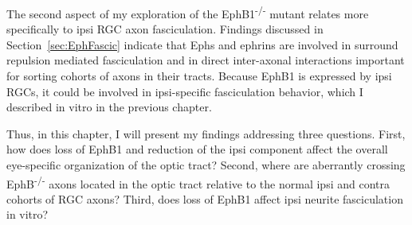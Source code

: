 The second aspect of my exploration of the EphB1\textsuperscript{-/-} mutant relates more specifically to ipsi RGC axon fasciculation.
Findings discussed in Section~\ref{sec:EphFascic} indicate that Ephs and ephrins are involved in surround repulsion mediated fasciculation and in direct inter-axonal interactions important for sorting cohorts of axons in their tracts.
Because EphB1 is expressed by ipsi RGCs, it could be involved in ipsi-specific fasciculation behavior, which I described in vitro in the previous chapter.

Thus, in this chapter, I will present my findings addressing three questions.
First, how does loss of EphB1 and reduction of the ipsi component affect the overall eye-specific organization of the optic tract?
Second, where are aberrantly crossing EphB\textsuperscript{-/-} axons located in the optic tract relative to the normal ipsi and contra cohorts of RGC axons?
Third, does loss of EphB1 affect ipsi neurite fasciculation in vitro?
